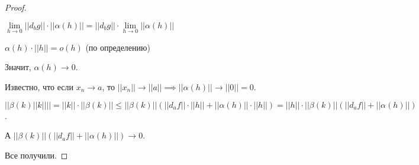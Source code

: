 \begin{proof}
\begin{remark}
        $\lim\limits_{h \to 0} ||d_b g|| \cdot ||\alpha(h)|| = ||d_b g|| \cdot \lim\limits_{h \to 0} ||\alpha(h)||$ 

        $\alpha(h) \cdot ||h|| = o(h)$ (по определению)

        Значит, $\alpha(h) \to 0$.

        Известно, что если $x_n \to a$, то $||x_n|| \to ||a|| \implies ||\alpha(h)|| \to ||0|| = 0$. 

    \end{remark} \thmslashn
    
    
    $||\beta(k) ||k|| || = ||k|| \cdot ||\beta(k)|| \le ||\beta(k)|| (||d_a f|| \cdot ||h|| + ||\alpha(h)|| \cdot ||h||) = ||h|| \cdot ||\beta(k)||(||d_a f|| + ||\alpha(h)||)$. 
    
    
    А $||\beta(k)||(||d_a f|| + ||\alpha(h)||) \to 0$.
    
    Все получили.
\end{proof}
